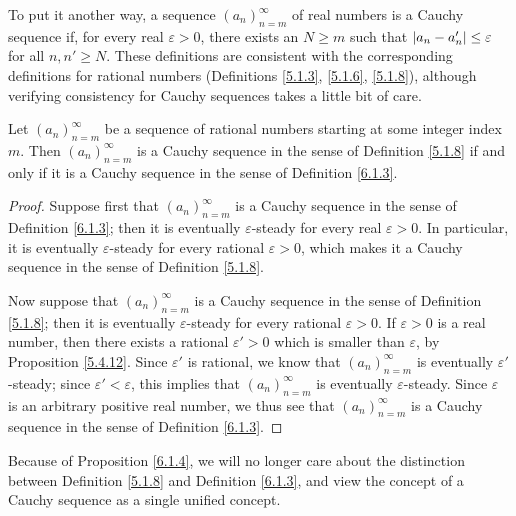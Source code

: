 \begin{note}
To put it another way, a sequence \((a_n)_{n = m}^\infty\) of real numbers is a Cauchy sequence if, for every real \(\varepsilon > 0\), there exists an \(N \geq m\) such that \(\abs*{a_n - a_n'} \leq \varepsilon\) for all \(n, n' \geq N\).
These definitions are consistent with the corresponding definitions for rational numbers (Definitions \ref{5.1.3}, \ref{5.1.6}, \ref{5.1.8}), although verifying consistency for Cauchy sequences takes a little bit of care.
\end{note}

\begin{proposition}\label{6.1.4}
Let \((a_n)_{n = m}^\infty\) be a sequence of rational numbers starting at some integer index \(m\).
Then \((a_n)_{n = m}^\infty\) is a Cauchy sequence in the sense of Definition \ref{5.1.8} if and only if it is a Cauchy sequence in the sense of Definition \ref{6.1.3}.
\end{proposition}

\begin{proof}
Suppose first that \((a_n)_{n = m}^\infty\) is a Cauchy sequence in the sense of Definition \ref{6.1.3};
then it is eventually \(\varepsilon\)-steady for every real \(\varepsilon > 0\).
In particular, it is eventually \(\varepsilon\)-steady for every rational \(\varepsilon > 0\), which makes it a Cauchy sequence in the sense of Definition \ref{5.1.8}.

Now suppose that \((a_n)_{n = m}^\infty\) is a Cauchy sequence in the sense of Definition \ref{5.1.8};
then it is eventually \(\varepsilon\)-steady for every rational \(\varepsilon > 0\).
If \(\varepsilon > 0\) is a real number, then there exists a rational \(\varepsilon' > 0\) which is smaller than \(\varepsilon\), by Proposition \ref{5.4.12}.
Since \(\varepsilon'\) is rational, we know that \((a_n)_{n = m}^\infty\) is eventually \(\varepsilon'\)-steady;
since \(\varepsilon' < \varepsilon\), this implies that \((a_n)_{n = m}^\infty\) is eventually \(\varepsilon\)-steady.
Since \(\varepsilon\) is an arbitrary positive real number, we thus see that \((a_n)_{n = m}^\infty\) is a Cauchy sequence in the sense of Definition \ref{6.1.3}.
\end{proof}

\begin{note}
Because of Proposition \ref{6.1.4}, we will no longer care about the distinction between Definition \ref{5.1.8} and Definition \ref{6.1.3}, and view the concept of a Cauchy sequence as a single unified concept.
\end{note}

